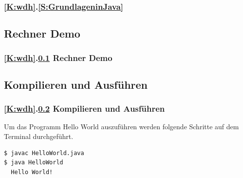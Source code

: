 \documentclass[c,18pt]{beamer}
\begin{document}
\begin{frame}[fragile]%
  \frametitle{\ref{K:wdh}.\ref{S:GrundlageninJava} \stitle}%

\textcolor{KITgreen}{} 

\end{frame}


\def\stitle{Rechner Demo}
\subsection{\stitle}\label{S:RechnerDemo0}
\begin{frame}[fragile]%
  \frametitle{\ref{K:wdh}.\ref{S:RechnerDemo0} \stitle}%


\end{frame}


\def\stitle{Kompilieren und Ausführen}
\subsection{\stitle}\label{S:CompilierenUexec}
\begin{frame}[fragile]%
  \frametitle{\ref{K:wdh}.\ref{S:CompilierenUexec} \stitle}%

Um das Programm Hello World auszuführen werden folgende Schritte auf dem Terminal durchgeführt.

\begin{lstlisting}[style=BASH]
$ javac HelloWorld.java
$ java HelloWorld
  Hello World!
\end{lstlisting}

\end{frame}


\def\stitle{Rechner Demo, FOR Schleife}
\end{document}
